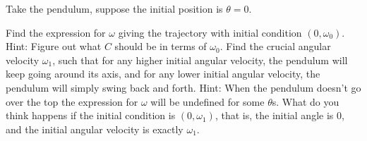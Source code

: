 \begin{exercise}[challenging]
Take the pendulum, suppose the initial position is $\theta = 0$.
\begin{tasks}
\task
Find the expression for $\omega$ giving the trajectory
with initial condition $(0,\omega_0)$.  Hint: Figure out what $C$
should be in terms of $\omega_0$.
\task
Find the crucial angular velocity $\omega_1$, such that
for any higher initial angular velocity,
the pendulum will keep going around its
axis, and for any lower initial angular velocity, the pendulum will simply
swing back and forth.
Hint: When the pendulum doesn't go over the top the expression for $\omega$
will be undefined for some $\theta$s.
\task
What do you think happens if the initial condition is $(0,\omega_1)$,
that is, the initial angle is 0, and the initial angular velocity is exactly
$\omega_1$.
\end{tasks}
\end{exercise}

\setcounter{exercise}{100}




